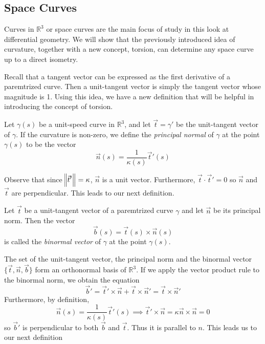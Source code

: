
\subsection{Space Curves}
Curves in \(\mathbb{R}^{3}\) or space curves are the main focus of study in this look at
differential geometry. We will show that the previously introduced idea of
curvature, together with a new concept, torsion, can determine any space curve up
to a direct isometry.

Recall that a tangent vector can be expressed as the first derivative of a
paremtrized curve. Then a unit-tangent vector is simply the tangent vector whose
magnitude is 1. Using this idea, we have a new definition that will be helpful
in introducing the concept of torsion.

\begin{definition}
  Let \(\gamma(s)\) be a unit-speed curve in \(\mathbb{R}^{3}\), and let \(\vec{t} = \gamma'\) be the
  unit-tangent vector of \(\gamma\). If the curvature is non-zero, we define the
  \textit{principal normal} of \(\gamma\) at the point \(\gamma(s)\)
  to be the vector
  \[
\vec{n}(s) = \frac{1}{\kappa(s)}\vec{t}'(s)
\]
\end{definition}

Observe that since \(\norm{\vec{t}'} = \kappa\), \(\vec{n}\) is a unit vector.
Furthermore, \(\vec{t} \cdot \vec{t}' = 0\) so \(\vec{n}\) and \(\vec{t}\) are
perpendicular. This leads to our next definition.

\begin{definition}
  Let \(\vec{t}\) be a unit-tangent vector of a paremtrized curve \(\gamma\) and let
  \(\vec{n}\) be its principal norm. Then the vector
  \[
\vec{b}(s) = \vec{t}(s) \times \vec{n}(s)
\]
  is called the \textit{binormal vector} of \(\gamma\) at the
  point \(\gamma(s)\).
\end{definition}

The set of the unit-tangent vector, the principal norm and the binormal vector
\(\{\vec{t}, \vec{n}, \vec{b}\}\) form an orthonormal basis of \(\mathbb{R}^{3}\). If we
apply the vector product rule to the binormal norm, we obtain the equation
\[
\vec{b}' = \vec{t}'\times \vec{n} + \vec{t} \times \vec{n}' = \vec{t} \times \vec{n}'
\]
Furthermore, by definition,
\[
\vec{n}(s) = \frac{1}{\kappa(s)}\vec{t}'(s) \implies \vec{t}'\times \vec{n} = \kappa
  \vec{n}\times \vec{n} = 0
\]
so \(\vec{b}'\) is perpendicular to both \(\vec{b}\) and \(\vec{t}\). Thus it is
parallel to \(n\). This leads us to our next definition

